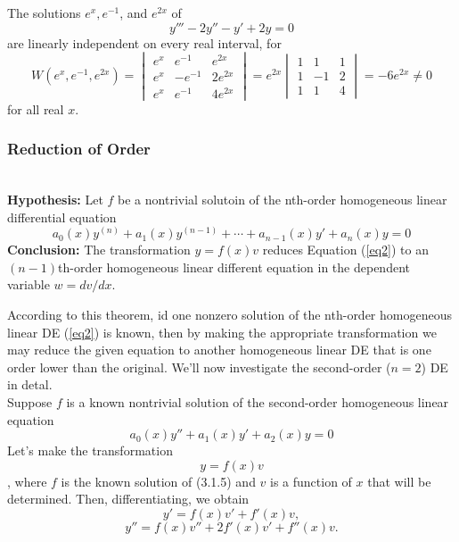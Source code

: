\begin{example}{}{}
    The solutions $e^{x}, e^{-1}$, and $e^{2x}$ of \[
        y''' - 2y'' - y' + 2y = 0
    \] are linearly independent on every real interval, for \[
        W(e^x, e^{-1}, e^{2x}) =
        \begin{vmatrix}
            e^{x} & e^{-1} & e^{2x} \\
            e^{x} & -e^{-1} & 2e^{2x} \\
            e^{x} & e^{-1} & 4e^{2x}
        \end{vmatrix}
        = e^{2x}
        \begin{vmatrix}
            1 & 1 & 1 \\
            1 & -1 & 2 \\
            1 & 1 & 4
        \end{vmatrix} 
        = -6e^{2x} \neq 0
    \] for all real $x$.
\end{example}


\vspace{20pt}
\subsubsection{Reduction of Order}

\begin{theorem}{}{}
    \\\textbf{Hypothesis:} Let $f$ be a nontrivial solutoin of the nth-order homogeneous linear differential equation
    \begin{equation}\tag{3.1.2}
        a_0(x)y^{(n)} + a_1(x)y^{(n-1)} + \cdots + a_{n-1}(x)y' + a_n(x)y = 0
    \end{equation}
    \textbf{Conclusion:} The transformation $y = f(x)v$ reduces Equation (\ref{eq2}) to an $(n-1)$th-order homogeneous linear different equation in the dependent variable $w = dv/dx$.
\end{theorem}

According to this theorem, id one nonzero solution of the nth-order homogeneous linear DE (\ref{eq2}) is known, then by making the appropriate transformation we may reduce the given equation to another homogeneous linear DE that is one order lower than the original. We'll now investigate the second-order ($n=2$) DE in detal.\\

Suppose $f$ is a known nontrivial solution of the second-order homogeneous linear equation
\begin{equation}
    a_0(x)y'' + a_1(x)y' + a_2(x)y = 0
\end{equation}
Let's make the transformation
\begin{equation}
    y = f(x)v
\end{equation}
, where $f$ is the known solution of (3.1.5) and $v$ is a function of $x$ that will be determined. Then, differentiating, we obtain
\begin{equation}
    y' = f(x)v' + f'(x)v,
\end{equation}
\begin{equation}
    y'' = f(x)v'' + 2f'(x)v' + f''(x)v.
\end{equation}


